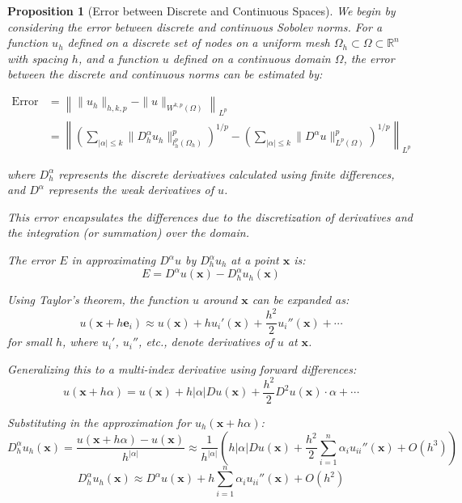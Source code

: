 \documentclass[11pt,a4paper]{article}
\theoremstyle{plain}
\newtheorem{proposition}[theorem]{Proposition}
\theoremstyle{definition}
\theoremstyle{remark}
\begin{document}
\begin{proposition}[Error between Discrete and Continuous Spaces]
We begin by considering the error between discrete and continuous Sobolev norms. For a function \( u_h \) defined on a discrete set of nodes on a uniform mesh \( \Omega_h \subset \Omega \subset \mathbb{R}^n \) with spacing \( h \), and a function \( u \) defined on a continuous domain \( \Omega \), the error between the discrete and continuous norms can be estimated by:

\begin{align*}
    \text{Error} &= \left\| \|u_h\|_{h,k,p} - \|u\|_{W^{k,p}(\Omega)} \right\|_{L^p}\\
     &= \left\| \left( \sum_{|\alpha| \leq k} \|D^\alpha_h u_h\|_{l^p_h(\Omega_h)}^p \right)^{1/p} - \left( \sum_{|\alpha| \leq k} \|D^\alpha u\|_{L^p(\Omega)}^p \right)^{1/p} \right\|_{L^p}
\end{align*}

where \( D^\alpha_h \) represents the discrete derivatives calculated using finite differences, and \( D^\alpha \) represents the weak derivatives of \( u \).

This error encapsulates the differences due to the discretization of derivatives and the integration (or summation) over the domain.





The error \( E \) in approximating \( D^\alpha u \) by \( D_h^\alpha u_h \) at a point \( \mathbf{x} \) is:
\[
E = D^\alpha u(\mathbf{x}) - D_h^\alpha u_h(\mathbf{x})
\]

Using Taylor's theorem, the function \( u \) around \( \mathbf{x} \) can be expanded as:
\[
u(\mathbf{x} + h\mathbf{e}_i) \approx u(\mathbf{x}) + hu_i'(\mathbf{x}) + \frac{h^2}{2}u_i''(\mathbf{x}) + \cdots
\]
for small \( h \), where \( u_i' \), \( u_i'' \), etc., denote derivatives of \( u \) at \( \mathbf{x} \).

Generalizing this to a multi-index derivative using forward differences:
\[
u(\mathbf{x} + h\alpha) = u(\mathbf{x}) + h |\alpha| Du(\mathbf{x}) + \frac{h^2}{2} D^2u(\mathbf{x}) \cdot \alpha + \cdots
\]

Substituting in the approximation for \( u_h(\mathbf{x} + h\alpha) \):
\[
D_h^\alpha u_h(\mathbf{x}) = \frac{u(\mathbf{x} + h\alpha) - u(\mathbf{x})}{h^{|\alpha|}} \approx \frac{1}{h^{|\alpha|}} \left(h |\alpha| Du(\mathbf{x}) + \frac{h^2}{2} \sum_{i=1}^n \alpha_i u_{ii}''(\mathbf{x}) + O(h^3)\right)
\]
\[
D_h^\alpha u_h(\mathbf{x}) \approx D^\alpha u(\mathbf{x}) + h \sum_{i=1}^n \alpha_i u_{ii}''(\mathbf{x}) + O(h^2)
\]


\end{proposition}
\end{document}
